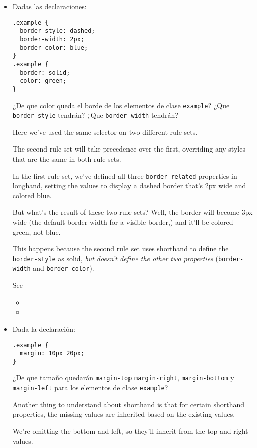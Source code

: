 \begin{exercise}
\begin{itemize}
\item Dadas las declaraciones:
\begin{verbatim}
.example {
  border-style: dashed;
  border-width: 2px;
  border-color: blue;
}
.example {
  border: solid;
  color: green;
}
\end{verbatim}
¿De que color queda el borde de los elementos de clase \verb|example|? 
¿Que \verb|border-style| tendrán?
¿Que \verb|border-width| tendrán?

Here we’ve used the same selector on two different rule sets. 

The second rule set will take precedence over the first, overriding any styles that are the same in both rule sets.

In the first rule set, we’ve defined all three \verb|border-related| properties in longhand, setting the values to display a dashed border that’s 2px wide and colored blue. 

But what’s the result of these two
rule sets? Well, the border will become 3px wide 
(the default border width for a visible border,) and it'll be colored green, not blue. 

This happens because the second rule set uses shorthand to
define the \verb|border-style| as solid, \emph{but doesn’t define the other two properties} (\verb|border-width| and 
\verb|border-color|).

See
\begin{itemize}
\item
{}
\item
{}
\end{itemize}

\item Dada la declaración:
\begin{verbatim}
.example {
  margin: 10px 20px;
}
\end{verbatim}
¿De que tamaño quedarán \verb|margin-top| \verb|margin-right|, \verb|margin-bottom| y \verb|margin-left| para los elementos de clase \verb|example|?

Another thing to understand about shorthand is that for certain shorthand properties, the missing values are inherited based on the existing values.

We’re omitting the bottom and left, so they'll inherit from the top and right values.

\end{itemize}
\end{exercise}

